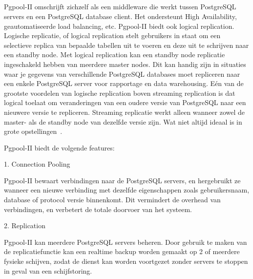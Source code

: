 
\subsection{}
\label{subsec:Pgpool-II}

Pgpool-II omschrijft zichzelf als een middleware die werkt tussen PostgreSQL servers en een PostgreSQL database client. Het ondersteunt High Availability, geautomatiseerde load balancing, etc. Pgpool-II biedt ook logical replication. Logische replicatie, of logical replication stelt gebruikers in staat om een selectieve replica van bepaalde tabellen uit te voeren en deze uit te schrijven naar een standby node. Met logical replication kan een standby node replicatie ingeschakeld hebben van meerdere master nodes. Dit kan handig zijn in situaties waar je gegevens van verschillende PostgreSQL databases moet repliceren naar een enkele PostgreSQL server voor rapportage en data warehousing. Eén van de grootste voordelen van logische replication boven streaming replication is dat logical toelaat om veranderingen van een oudere versie van PostgreSQL naar een nieuwere versie te repliceren. Streaming replicatie werkt alleen wanneer zowel de master- als de standby node van dezelfde versie zijn. Wat niet altijd ideaal is in grote opstellingen~\autocite{Vallarapu2019}. %

Pgpool-II biedt de volgende features:

1. Connection Pooling

Pgpool-II bewaart verbindingen naar de PostgreSQL servers, en hergebruikt ze wanneer een nieuwe verbinding met dezelfde eigenschappen zoals gebruikersnaam, database of protocol versie binnenkomt. Dit vermindert de overhead van verbindingen, en verbetert de totale doorvoer van het systeem.

2. Replication

Pgpool-II kan meerdere PostgreSQL servers beheren. Door gebruik te maken van de replicatiefunctie kan een realtime backup worden gemaakt op 2 of meerdere fysieke schijven, zodat de dienst kan worden voortgezet zonder servers te stoppen in geval van een schijfstoring.

